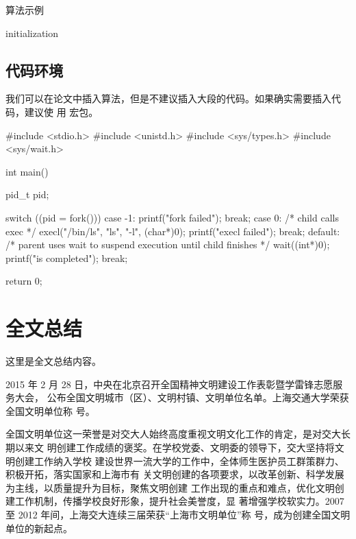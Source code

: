 \documentclass{sjtureport}
\begin{document}
\begin{algorithm}[htb]
	\caption{算法示例}
	\label{algo:algorithm}
	\small
	\SetAlgoLined

	initialization\;
\end{algorithm}

\section{代码环境}

我们可以在论文中插入算法，但是不建议插入大段的代码。如果确实需要插入代码，建议使
用  宏包。

\begin{codeblock}[language=C]
#include <stdio.h>
#include <unistd.h>
#include <sys/types.h>
#include <sys/wait.h>

int main() {
	pid_t pid;

	switch ((pid = fork())) {
	case -1:
	printf("fork failed\n");
	break;
	case 0:
	/* child calls exec */
	execl("/bin/ls", "ls", "-l", (char*)0);
	printf("execl failed\n");
	break;
	default:
	/* parent uses wait to suspend execution until child finishes */
	wait((int*)0);
	printf("is completed\n");
	break;
	}

	return 0;
}
\end{codeblock}

\chapter{全文总结}

这里是全文总结内容。

2015 年 2 月 28 日，中央在北京召开全国精神文明建设工作表彰暨学雷锋志愿服务大会，
公布全国文明城市（区）、文明村镇、文明单位名单。上海交通大学荣获全国文明单位称
号。

全国文明单位这一荣誉是对交大人始终高度重视文明文化工作的肯定，是对交大长期以来文
明创建工作成绩的褒奖。在学校党委、文明委的领导下，交大坚持将文明创建工作纳入学校
建设世界一流大学的工作中，全体师生医护员工群策群力、积极开拓，落实国家和上海市有
关文明创建的各项要求，以改革创新、科学发展为主线，以质量提升为目标，聚焦文明创建
工作出现的重点和难点，优化文明创建工作机制，传播学校良好形象，提升社会美誉度，显
著增强学校软实力。2007 至 2012 年间，上海交大连续三届荣获“上海市文明单位”称
号，成为创建全国文明单位的新起点。
\end{document}
